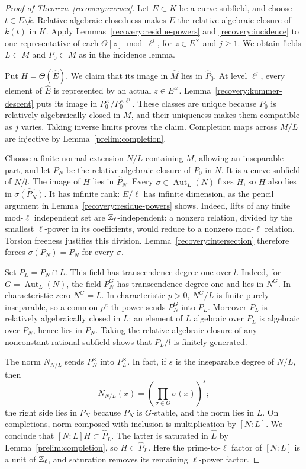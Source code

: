 \begin{proof}[Proof of Theorem~\ref{recovery:curves}]
Let $E\subset K$ be a curve subfield, and choose $t\in E\setminus k$.
Relative algebraic closedness makes $E$
the relative algebraic closure of $k(t)$ in $K$. Apply
Lemmas~\ref{recovery:residue-powers} and \ref{recovery:incidence} to
one representative of each $\Theta[z]\bmod\ell^j$, for
$z\in E^\times$ and $j\geq1$. We obtain fields $L\subset M$ and
$P_0\subset M$ as in the incidence lemma.

Put $H=\Theta(\widehat E)$. We claim that its image in $\widehat M$
lies in $\widehat P_0$. At level $\ell^j$, every element of
$\widehat E$ is represented by an actual $z\in E^\times$.
Lemma~\ref{recovery:kummer-descent} puts its image in
$P_0^\times/P_0^{\times\ell^j}$. These classes are unique because
$P_0$ is relatively algebraically closed in $M$, and their uniqueness
makes them compatible as $j$ varies. Taking inverse limits proves
the claim. Completion maps across $M/L$ are injective by
Lemma~\ref{prelim:completion}.

Choose a finite normal extension $N/L$ containing $M$, allowing an
inseparable part, and let $P_N$ be the relative algebraic closure of
$P_0$ in $N$. It is a curve subfield of $N/l$. The image of $H$ lies
in $\widehat P_N$. Every $\sigma\in\operatorname{Aut}_L(N)$ fixes
$H$, so $H$ also lies in $\widehat{\sigma(P_N)}$.
It has infinite rank: $\widehat E/\ell$ has infinite dimension, as
the pencil argument in Lemma~\ref{recovery:residue-powers} shows.
Indeed, lifts of any finite mod-$\ell$ independent set are
$\mathbb Z_\ell$-independent: a nonzero relation, divided by the smallest
$\ell$-power in its coefficients, would reduce to a nonzero
mod-$\ell$ relation. Torsion freeness justifies this division.
Lemma~\ref{recovery:intersection} therefore forces
$\sigma(P_N)=P_N$ for every $\sigma$.

Set $P_L=P_N\cap L$. This field has transcendence degree one over
$l$. Indeed, for $G=\operatorname{Aut}_L(N)$, the field $P_N^G$ has
transcendence degree one and lies in $N^G$. In characteristic zero
$N^G=L$. In characteristic $p>0$, $N^G/L$ is finite purely inseparable,
so a common $p^a$-th power sends $P_N^G$ into $P_L$. Moreover $P_L$
is relatively algebraically closed in $L$: an element of $L$
algebraic over $P_L$ is algebraic over $P_N$, hence lies in $P_N$.
Taking the relative algebraic closure of any nonconstant rational
subfield shows that $P_L/l$ is finitely generated.

The norm $N_{N/L}$ sends $P_N^\times$ into $P_L^\times$. In fact,
if $s$ is the inseparable degree of $N/L$, then
\[
 N_{N/L}(x)=\left(\prod_{\sigma\in G}\sigma(x)\right)^s;
\]
the right side lies in $P_N$ because $P_N$ is $G$-stable, and the norm lies in
$L$. On completions, norm composed with inclusion is multiplication
by $[N:L]$. We conclude that
$[N:L]H\subset\widehat P_L$. The latter is saturated in
$\widehat L$ by Lemma~\ref{prelim:completion}, so
$H\subset\widehat P_L$.
Here the prime-to-$\ell$ factor of $[N:L]$ is a unit of $\mathbb Z_\ell$,
and saturation removes its remaining $\ell$-power factor.


\end{proof}
